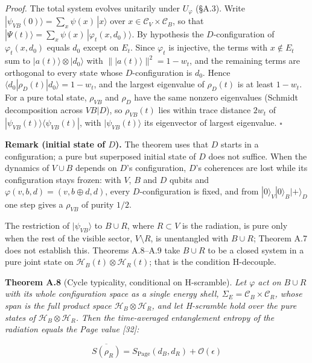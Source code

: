 \documentclass[
]{article}
\begin{document}
\emph{Proof.} The total system evolves unitarily under \(U_\varphi\)
(§A.3). Write \(|\psi_{VB}(0)\rangle = \sum_x \psi(x)\,|x\rangle\) over
\(x \in \mathcal{C}_V \times \mathcal{C}_B\), so that
\(|\Psi(t)\rangle = \sum_x \psi(x)\,|\varphi_t(x, d_0)\rangle\). By
hypothesis the \(D\)-configuration of \(\varphi_t(x, d_0)\) equals
\(d_0\) except on \(E_t\). Since \(\varphi_t\) is injective, the terms
with \(x \notin E_t\) sum to \(|a(t)\rangle \otimes |d_0\rangle\) with
\(\||a(t)\rangle\|^2 = 1 - w_t\), and the remaining terms are orthogonal
to every state whose \(D\)-configuration is \(d_0\). Hence
\(\langle d_0|\rho_D(t)|d_0\rangle = 1 - w_t\), and the largest
eigenvalue of \(\rho_D(t)\) is at least \(1 - w_t\). For a pure total
state, \(\rho_{VB}\) and \(\rho_D\) have the same nonzero eigenvalues
(Schmidt decomposition across \(VB|D\)), so \(\rho_{VB}(t)\) lies within
trace distance \(2 w_t\) of
\(|\psi_{VB}(t)\rangle\langle\psi_{VB}(t)|\), with
\(|\psi_{VB}(t)\rangle\) its eigenvector of largest eigenvalue.
\(\square\)

\textbf{Remark (initial state of \(D\)).} The theorem uses that \(D\)
starts in a configuration; a pure but superposed initial state of \(D\)
does not suffice. When the dynamics of \(V \cup B\) depends on \(D\)'s
configuration, \(D\)'s coherences are lost while its configuration stays
frozen: with \(V\), \(B\) and \(D\) qubits and
\(\varphi(v, b, d) = (v, b \oplus d, d)\), every \(D\)-configuration is
fixed, and from \(|0\rangle_V |0\rangle_B |+\rangle_D\) one step gives a
\(\rho_{VB}\) of purity \(1/2\).

The restriction of \(|\psi_{VB}\rangle\) to \(B \cup R\), where
\(R \subset V\) is the radiation, is pure only when the rest of the
visible sector, \(V \setminus R\), is unentangled with \(B \cup R\);
Theorem A.7 does not establish this. Theorems A.8--A.9 take \(B \cup R\)
to be a closed system in a pure joint state on
\(\mathcal{H}_B(t) \otimes \mathcal{H}_R(t)\); that is the condition
H-decouple.

\textbf{Theorem A.8} (Cycle typicality, conditional on H-scramble).
\emph{Let \(\varphi\) act on \(B \cup R\) with its whole configuration
space as a single energy shell,
\(\Sigma_E = \mathcal{C}_B \times \mathcal{C}_R\), whose span is the
full product space \(\mathcal{H}_B \otimes \mathcal{H}_R\), and let
H-scramble hold over the pure states of
\(\mathcal{H}_B \otimes \mathcal{H}_R\). Then the time-averaged
entanglement entropy of the radiation equals the Page value {[}32{]}:}

\[\overline{S(\rho_R)} = S_{\text{Page}}(d_B, d_R) + \mathcal{O}(\epsilon)\]
\end{document}
